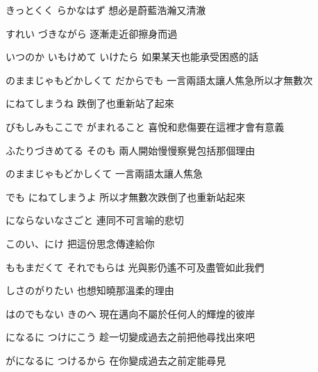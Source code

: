 \documentclass[12pt]{article}
\begin{document}
{きっとくく らかなはず
\hfill {\small
想必是蔚藍浩瀚又清澈 }

\item
すれい づきながら
\hfill {\small
逐漸走近卻擦身而過 }

いつのか いもけめて いけたら
\hfill {\small
如果某天也能承受困惑的話 }

\item
{}のままじゃもどかしくて だからでも
\hfill {\small
一言兩語太讓人焦急所以才無數次 }

にねてしまうね
\hfill {\small
跌倒了也重新站了起來 }

びもしみもここで がまれること
\hfill {\small
喜悅和悲傷要在這裡才會有意義 }

ふたりづきめてる そのも
\hfill {\small
兩人開始慢慢察覺包括那個理由 }

\item
{}のままじゃもどかしくて
\hfill {\small
一言兩語太讓人焦急 }

でも にねてしまうよ
\hfill {\small
所以才無數次跌倒了也重新站起來 }

にならないなさごと
\hfill {\small
連同不可言喻的悲切 }

このい、にけ
\hfill {\small
把這份思念傳達給你 }

\item
{}ももまだくて それでもらは
\hfill {\small
光與影仍遙不可及盡管如此我們 }

しさのがりたい
\hfill {\small
也想知曉那溫柔的理由 }

はのでもない きのへ
\hfill {\small
現在邁向不屬於任何人的輝煌的彼岸 }

になるに つけにこう
\hfill {\small
趁一切變成過去之前把他尋找出來吧 }

\item
{}がになるに つけるから
\hfill {\small
在你變成過去之前定能尋見 }
}
\end{document}
